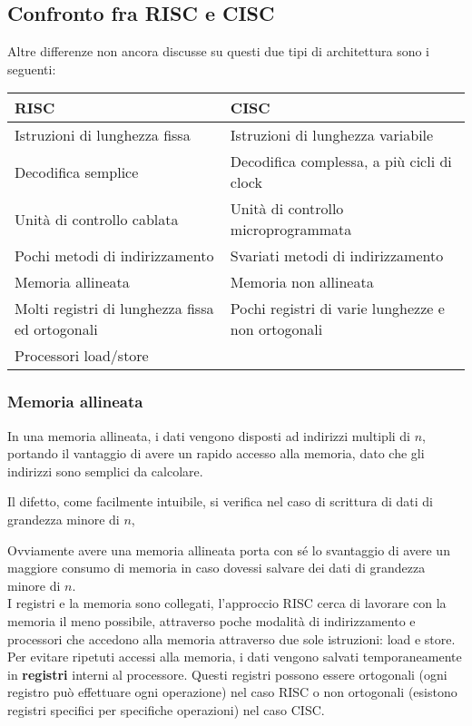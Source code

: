 \documentclass[../ace.tex]{subfiles}
\begin{document}
\newpage
\subsection{Confronto fra RISC e CISC}
Altre differenze non ancora discusse su questi due tipi di architettura sono i seguenti:

\begin{table}[h]
    \centering
    \begin{tabu}{|m{.4\textwidth}|m{.4\textwidth}|}
        \rowfont{\centering\bfseries\color{clr-primary}}
        \hline
        RISC & CISC \\
        \hline
        Istruzioni di lunghezza fissa & Istruzioni di lunghezza variabile\\
        \hline
        Decodifica semplice & Decodifica complessa, a più cicli di clock\\
        \hline
        Unità di controllo cablata & Unità di controllo microprogrammata\\
        \hline
        Pochi metodi di indirizzamento & Svariati metodi di indirizzamento\\
        \hline
        Memoria allineata & Memoria non allineata\\
        \hline
        Molti registri di lunghezza fissa ed ortogonali & Pochi registri di varie lunghezze e non ortogonali\\
        \hline
        Processori load/store&\\
        \hline
    \end{tabu}
\end{table}

\subsubsection{Memoria allineata}
In una memoria allineata, i dati vengono disposti ad indirizzi multipli di $n$, portando il vantaggio di avere un rapido accesso alla memoria, dato che gli indirizzi sono semplici da calcolare.

Il difetto, come facilmente intuibile, si verifica nel caso di scrittura di dati di grandezza minore di $n$,

Ovviamente avere una memoria allineata porta con sé lo svantaggio di avere un maggiore consumo di memoria in
caso dovessi salvare dei dati di grandezza minore di $n$.
\\
I registri e la memoria sono collegati, l'approccio RISC cerca di lavorare con la memoria il meno
possibile, attraverso poche modalità di indirizzamento e processori che accedono alla memoria attraverso
due sole istruzioni: load e store.
Per evitare ripetuti accessi alla memoria, i dati vengono salvati temporaneamente in \textbf{registri} interni
al processore. Questi registri possono essere ortogonali (ogni registro può effettuare ogni operazione) nel
caso RISC o non ortogonali (esistono registri specifici per specifiche operazioni) nel caso CISC.
\end{document}
